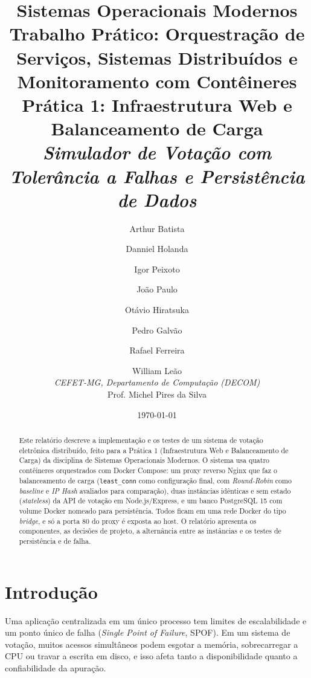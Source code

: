 \documentclass[12pt,a4paper]{article}
\title{
    \textbf{Sistemas Operacionais Modernos} \\
    \large Trabalho Prático: Orquestração de Serviços, Sistemas Distribuídos e Monitoramento com Contêineres \\
    \vspace{0.5cm}
    \Large \textbf{Prática 1: Infraestrutura Web e Balanceamento de Carga} \\
    \normalsize \textit{Simulador de Votação com Tolerância a Falhas e Persistência de Dados}
}
\author{
    Arthur Batista \and Danniel Holanda \and Igor Peixoto \and João Paulo \and Otávio Hiratsuka \and Pedro Galvão \and Rafael Ferreira \and William Leão \\
    \textit{CEFET-MG, Departamento de Computação (DECOM)} \\
    Prof. Michel Pires da Silva
}
\date{\today}
\begin{document}
\maketitle

\begin{abstract}
Este relatório descreve a implementação e os testes de um sistema de votação eletrônica distribuído, feito para a Prática 1 (Infraestrutura Web e Balanceamento de Carga) da disciplina de Sistemas Operacionais Modernos. O sistema usa quatro contêineres orquestrados com Docker Compose: um proxy reverso Nginx que faz o balanceamento de carga (\texttt{least\_conn} como configuração final, com \textit{Round-Robin} como \textit{baseline} e \textit{IP Hash} avaliados para comparação), duas instâncias idênticas e sem estado (\textit{stateless}) da API de votação em Node.js/Express, e um banco PostgreSQL 15 com volume Docker nomeado para persistência. Todos ficam em uma rede Docker do tipo \textit{bridge}, e só a porta 80 do proxy é exposta ao host. O relatório apresenta os componentes, as decisões de projeto, a alternância entre as instâncias e os testes de persistência e de falha.
\end{abstract}

\tableofcontents
\newpage

\section{Introdução}
Uma aplicação centralizada em um único processo tem limites de escalabilidade e um ponto único de falha (\textit{Single Point of Failure}, SPOF). Em um sistema de votação, muitos acessos simultâneos podem esgotar a memória, sobrecarregar a CPU ou travar a escrita em disco, e isso afeta tanto a disponibilidade quanto a confiabilidade da apuração.
\end{document}
